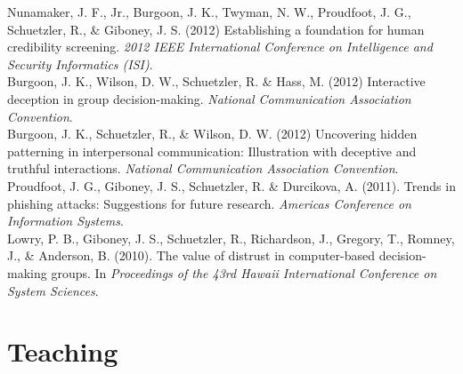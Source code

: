 \documentclass[10pt, a4paper]{article}
\newcommand{\years}[1]{\marginnote{\scriptsize #1}}
\begin{document}
Nunamaker, J. F., Jr., Burgoon, J. K., Twyman, N. W., Proudfoot, J. G.,
Schuetzler, R., \& Giboney, J. S. (2012) Establishing a foundation for human
credibility screening. \emph{2012 IEEE International Conference on Intelligence
  and Security Informatics (ISI)}.\\

Burgoon, J. K., Wilson, D. W., Schuetzler, R. \& Hass, M. (2012) Interactive
deception in group decision-making. \emph{National Communication Association
  Convention}.\\

Burgoon, J. K., Schuetzler, R., \& Wilson, D. W. (2012) Uncovering hidden
patterning in interpersonal communication: Illustration with deceptive and
truthful interactions. \emph{National Communication Association Convention}.\\
\newpage
\years{2011}Proudfoot, J. G., Giboney, J. S., Schuetzler, R. \& Durcikova,
A. (2011). Trends in phishing attacks: Suggestions for future
research. \emph{Americas Conference on Information Systems}.\\

\years{2010}Lowry, P. B., Giboney, J. S., Schuetzler, R., Richardson, J.,
Gregory, T., Romney, J., \& Anderson, B. (2010). The value of distrust in
computer-based decision-making groups. In \emph{Proceedings of the 43rd Hawaii
  International Conference on System Sciences}.



\section*{Teaching}

\end{document}
